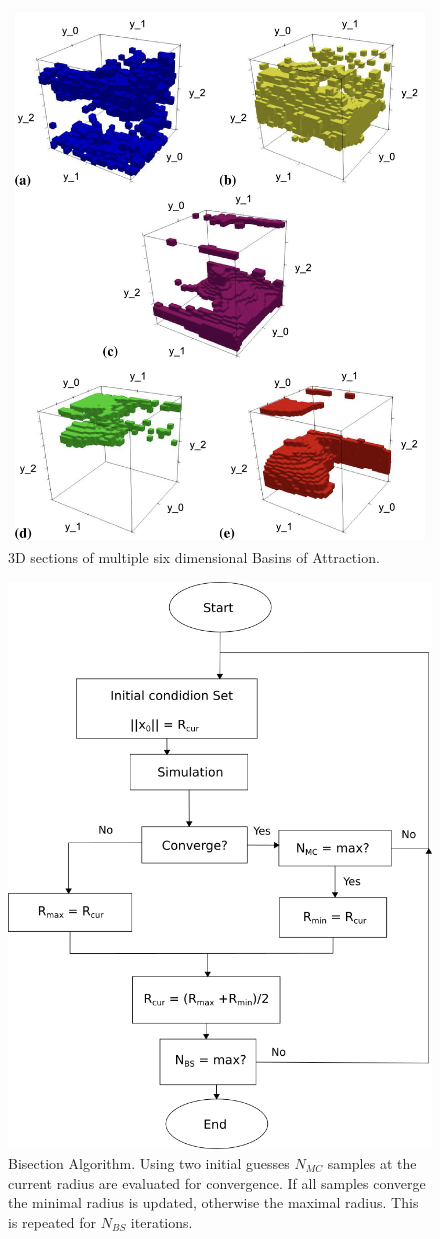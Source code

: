 \begin{figure}[ht]
    \centering
    \includegraphics[width=.5\linewidth]{figures/IMG_0783.jpg}
    \caption[Six Dimensional Basin of Attraction]{3D sections of multiple six dimensional Basins of Attraction. \cite{sixdim}}
    \label{fig:sboa}
\end{figure}


\begin{figure}[h]
    \centering
    \includegraphics[width=.5\linewidth]{figures/bisection.png}
    \caption[Biseciton Algorithm]{Bisection Algorithm. Using two initial guesses $N_{MC}$ samples at the current radius are evaluated for convergence. If all samples converge the minimal radius is updated, otherwise the maximal radius. This is repeated for $N_{BS}$ iterations. \cite{quant}}
    \label{fig:alg}
\end{figure}

